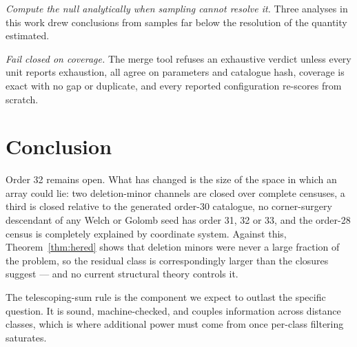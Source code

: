 \documentclass[11pt,a4paper]{article}
\theoremstyle{definition}
\theoremstyle{remark}
\begin{document}
\emph{Compute the null analytically when sampling cannot resolve it.} Three
analyses in this work drew conclusions from samples far below the resolution of
the quantity estimated.

\emph{Fail closed on coverage.} The merge tool refuses an exhaustive verdict
unless every unit reports exhaustion, all agree on parameters and catalogue hash,
coverage is exact with no gap or duplicate, and every reported configuration
re-scores from scratch.

\section{Conclusion}

Order 32 remains open. What has changed is the size of the space in which an
array could lie: two deletion-minor channels are closed over complete censuses, a
third is closed relative to the generated order-30 catalogue, no corner-surgery
descendant of any Welch or Golomb seed has order 31, 32 or 33, and the order-28
census is completely explained by coordinate system. Against this,
Theorem~\ref{thm:hered} shows that deletion minors were never a large fraction of
the problem, so the residual class is correspondingly larger than the closures
suggest --- and no current structural theory controls it.

The telescoping-sum rule is the component we expect to outlast the specific
question. It is sound, machine-checked, and couples information across
distance classes, which is where additional power must come from once per-class
filtering saturates.
\end{document}
